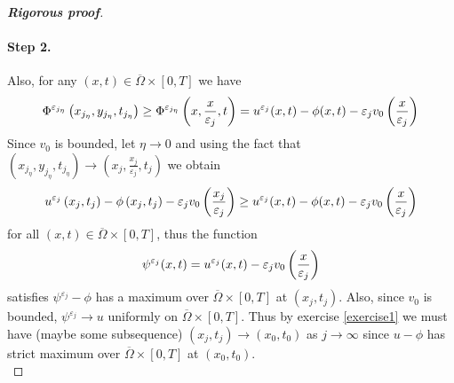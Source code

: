\documentclass[12pt, oneside]{amsart}  	%
\begin{document}
\begin{proof}[\textbf{Rigorous proof}]
\paragraph{\textbf{Step 2.}} Also, for any $(x,t)\in \overline{\Omega}\times [0,T]$ we have
\begin{equation*}
\Phi^{\varepsilon_{j_\eta}}\left(x_{j_\eta}, {y_{j_\eta}}, t_{j_\eta}\right) \geq  \Phi^{\varepsilon_{j_\eta}}\left(x, \frac{x}{\varepsilon_j}, t\right) = u^{\varepsilon_j}(x,t) -  \phi(x,t) -\varepsilon_j v_0\left(\frac{x}{\varepsilon_j}\right)
\end{equation*}
Since $v_0$ is bounded, let $\eta\longrightarrow 0$ and using the fact that $\left(x_{j_\eta}, {y_{j_\eta}}, t_{j_\eta}\right) \longrightarrow \left(x_j, \frac{x_j}{\varepsilon_j}, t_j\right)$ we obtain
\begin{equation*}
u^{\varepsilon_j}\left(x_j,t_j\right) -  \phi\left(x_j,t_j\right) -\varepsilon_j v_0\left(\frac{x_j}{\varepsilon_j}\right) \geq u^{\varepsilon_j}(x,t) -  \phi(x,t) -\varepsilon_j v_0\left(\frac{x}{\varepsilon_j}\right) 
\end{equation*}
for all $(x,t)\in \overline{\Omega}\times [0,T]$, thus the function
\begin{equation*}
\psi^{\varepsilon_j}(x,t)= u^{\varepsilon_j}(x,t) -\varepsilon_j v_0\left(\frac{x}{\varepsilon_j}\right)
\end{equation*}
satisfies $\psi^{\varepsilon_j} - \phi$ has a maximum over $\overline{\Omega}\times [0,T]$ at $\left(x_j,t_j\right)$. Also, since $v_0$ is bounded, $\psi^{\varepsilon_j}\longrightarrow u$ uniformly on $\overline{\Omega}\times [0,T]$. Thus by exercise \ref{exercise1} we must have (maybe some subsequence) $\left(x_j,t_j\right) \longrightarrow \left(x_0,t_0\right)$
as $j \longrightarrow \infty$ since $u-\phi$ has strict maximum over $\overline{\Omega}\times [0,T]$ at $\left(x_0,t_0\right)$.\\







	
	

\end{proof}
\end{document}
